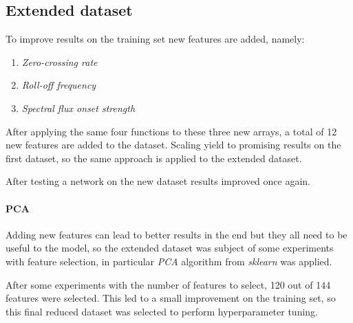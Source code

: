 \subsection{Extended dataset}
\label{extended-dataset}

To improve results on the training set new features are added, namely: 
\begin{enumerate}
    \item \emph{Zero-crossing rate}
    \item \emph{Roll-off frequency}
    \item \emph{Spectral flux onset strength}
\end{enumerate}
After applying the same four functions to these three new arrays, 
a total of 12 new features are added to the dataset.
Scaling yield to promising results on the first dataset, 
so the same approach is applied to the extended dataset.

After testing a network on the new dataset results improved once again.

\paragraph{PCA}
Adding new features can lead to better results 
in the end but they all need to be useful to the model, so 
the extended dataset was subject of some experiments with feature selection, 
in particular \emph{PCA} algorithm from \emph{sklearn} was applied.

After some experiments with the number of features to select, 120 out of 144 
features were selected. This led to a small improvement on the training set, 
so this final reduced dataset was selected to perform hyperparameter tuning.

\newpage